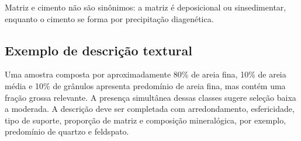 Matriz e cimento não são sinônimos: a matriz é deposicional ou sinsedimentar, enquanto o cimento se forma por precipitação diagenética.

\subsection{Exemplo de descrição textural}

Uma amostra composta por aproximadamente 80\% de areia fina, 10\% de areia média e 10\% de grânulos apresenta predomínio de areia fina, mas contém uma fração grossa relevante. A presença simultânea dessas classes sugere seleção baixa a moderada. A descrição deve ser completada com arredondamento, esfericidade, tipo de suporte, proporção de matriz e composição mineralógica, por exemplo, predomínio de quartzo e feldspato.
